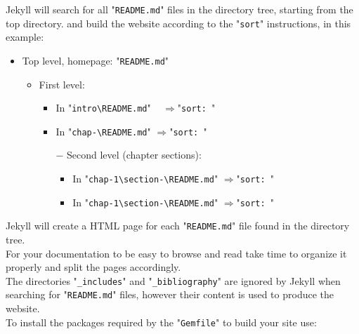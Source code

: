 \clearpage
\noindent Jekyll will search for all "\texttt{README.md}" files in the directory tree, starting from the top directory. 
and build the website according to the "\texttt{sort}" instructions, in this example:
\begin{itemize}
\item Top level, homepage: "\texttt{README.md}"
\begin{itemize}
\item First level: \\
\begin{itemize}
\item In "\texttt{intro\textbackslash README.md}"  \,\,\ \quad$\Longrightarrow$\quad "\texttt{sort: }"\\
\item In "\texttt{chap-\textbackslash README.md}" \quad$\Longrightarrow$\quad "\texttt{sort: }"\\
\item[$-$] Second level (chapter sections): \\
\begin{itemize}
\item In "\texttt{chap-1\textbackslash section-\textbackslash README.md}" \quad$\Longrightarrow$\quad "\texttt{sort: }"\\
\item In "\texttt{chap-1\textbackslash section-\textbackslash README.md}" \quad$\Longrightarrow$\quad "\texttt{sort: }"\\
\end{itemize}
\end{itemize}
\end{itemize}
\end{itemize}
Jekyll will create a HTML page for each "\texttt{README.md}" file found in the directory tree. \\
For your documentation to be easy to browse and read take time to organize it properly and split the pages accordingly. \\
The directories "\texttt{\_includes}" and "\texttt{\_bibliography}" are ignored by Jekyll when searching for "\texttt{README.md}" files, 
however their content is used to produce the website. \\[0.25cm]
To install the packages required by the "\texttt{Gemfile}" to build your site use:
\begin{script}
  
\end{script}\\[-0.75cm]
